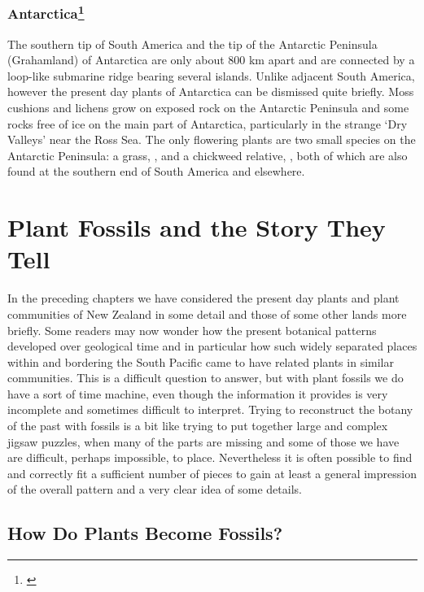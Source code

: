 \subsection[Antarctica]{Antarctica\footnote{\cite{wace1965vascular}}}

The southern tip of South America and the tip of the Antarctic Peninsula (Grahamland) of Antarctica are only about 800 km apart and are connected by a loop-like submarine ridge bearing several islands.
Unlike adjacent South America, however the present day plants of Antarctica can be dismissed quite briefly.
Moss cushions and lichens grow on exposed rock on the Antarctic Peninsula and some rocks free of ice on the main part of Antarctica, particularly in the strange `Dry Valleys' near the Ross Sea.
The only flowering plants are two small species on the Antarctic Peninsula: a grass, , and a chickweed relative, , both of which are also found at the southern end of South America and elsewhere.

\chapter{Plant Fossils and the Story They Tell}

In the preceding chapters we have considered the present day plants and plant communities of New Zealand in some detail and those of some other lands more briefly.
Some readers may now wonder how the present botanical patterns developed over geological time and in particular how such widely separated places within and bordering the South Pacific came to have related plants in similar communities.
This is a difficult question to answer, but with plant fossils we do have a sort of time machine, even though the information it provides is very incomplete and sometimes difficult to interpret.
Trying to reconstruct the botany of the past with fossils is a bit like trying to put together large and complex jigsaw puzzles, when many of the parts are missing and some of those we have are difficult, perhaps impossible, to place.
Nevertheless it is often possible to find and correctly fit a sufficient number of pieces to gain at least a general impression of the overall pattern and a very clear idea of some details.

\section{How Do Plants Become Fossils?}

